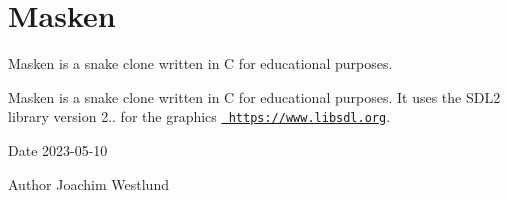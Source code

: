 \chapter{Masken}
\hypertarget{index}{}\label{index}
Masken is a snake clone written in C for educational purposes.

Masken is a snake clone written in C for educational purposes. It uses the SDL2 library version 2.. for the graphics \href{https://www.libsdl.org}{\texttt{ https\+://www.\+libsdl.\+org}}.

\begin{DoxyDate}{Date}
2023-\/05-\/10 
\end{DoxyDate}
\begin{DoxyAuthor}{Author}
Joachim Westlund 
\end{DoxyAuthor}
